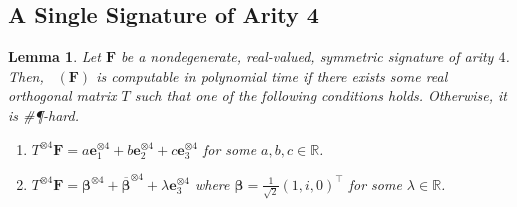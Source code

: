 \documentclass[11pt]{article}
\newtheorem{lemma}[theorem]{Lemma}
\DeclareMathOperator{\holts}{Holant^*_3}
\newcommand{\sph}{\#\P-hard\xspace}
\newcommand{\transpose}{^\intercal}
\begin{document}
\subsection{A Single Signature of Arity 4}
\begin{lemma}\label{lem:dichotomy-single-arity-4}
Let $\mathbf{F}$ be a nondegenerate, real-valued, symmetric signature of arity $4$.
Then, $\holts(\mathbf{F})$ is computable in polynomial time if there exists some real orthogonal matrix $T$ such that one of the following conditions holds.
Otherwise, it is \sph.
\begin{enumerate}
  \item $T^{\otimes 4} \mathbf{F} = a \mathbf{e}_1^{\otimes 4} + b \mathbf{e}_2^{\otimes 4} + c \mathbf{e}_3^{\otimes 4}$ for some $a, b, c \in \mathbb{R}$.
  \item $T^{\otimes 4}\mathbf{F} = \boldsymbol{\beta}^{\otimes 4} + \overline{\boldsymbol{\beta}}^{\otimes 4} + \lambda \mathbf{e}_3^{\otimes 4}$ where $\boldsymbol{\beta} = \frac{1}{\sqrt{2}}(1, i, 0)\transpose$ for some $\lambda \in \mathbb{R}$.
\end{enumerate}
\end{lemma} 
\end{document}
